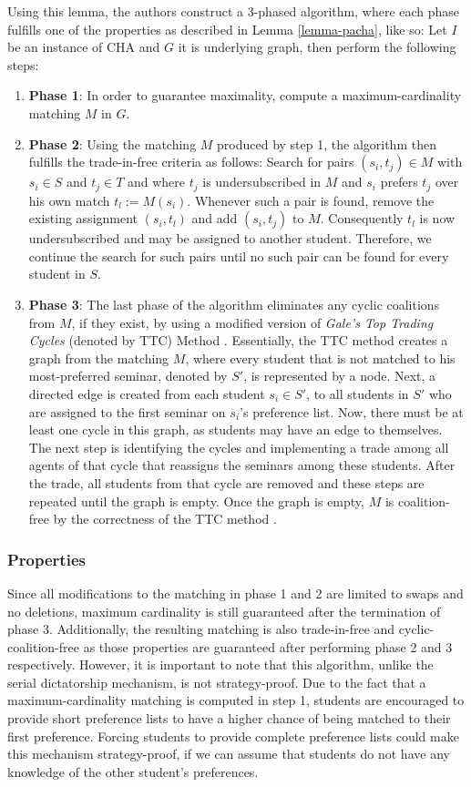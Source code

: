 Using this lemma, the authors \cite{SngThesis, Abraham:Pacha} construct a 3-phased algorithm, where each phase fulfills one of the properties as described in Lemma \ref{lemma-pacha}, like so: Let $I$ be an instance of CHA and $G$ it is underlying graph, then perform the following steps:
\begin{enumerate}
    \item \textbf{Phase 1}: In order to guarantee maximality, compute a maximum-cardinality matching $M$ in $G$.
    \item \textbf{Phase 2}: Using the matching $M$ produced by step 1, the algorithm then fulfills the trade-in-free criteria as follows: Search for pairs $(s_i, t_j) \in M$ with $s_i \in S$ and $t_j \in T$ and where $t_j$ is undersubscribed in $M$ and $s_i$ prefers $t_j$ over his own match $t_l := M(s_i)$. Whenever such a pair is found, remove the existing assignment $(s_i, t_l)$ and add $(s_i, t_j)$ to $M$. Consequently $t_l$ is now undersubscribed and may be assigned to another student. Therefore, we continue the search for such pairs until no such pair can be found for every student in $S$.
    \item \textbf{Phase 3}: The last phase of the algorithm eliminates any cyclic coalitions from $M$, if they exist, by using a modified version of \emph{Gale's Top Trading Cycles} (denoted by TTC) Method \cite{ShapleyTTC}. Essentially, the TTC method creates a graph from the matching $M$, where every student that is not matched to his most-preferred seminar, denoted by $S'$, is represented by a node. Next, a directed edge is created from each student $s_i \in S'$, to all students in $S'$ who are assigned to the first seminar on $s_i$'s preference list. Now, there must be at least one cycle in this graph, as students may have an edge to themselves. The next step is identifying the cycles and implementing a trade among all agents of that cycle that reassigns the seminars among these students. After the trade, all students from that cycle are removed and these steps are repeated until the graph is empty. Once the graph is empty, $M$ is coalition-free by the correctness of the TTC method \cite{Abraham:Pacha}.
\end{enumerate}

\subsubsection{Properties}
Since all modifications to the matching in phase 1 and 2 are limited to swaps and no deletions, maximum cardinality is still guaranteed after the termination of phase 3. Additionally, the resulting matching is also trade-in-free and cyclic-coalition-free as those properties are guaranteed after performing phase 2 and 3 respectively. However, it is important to note that this algorithm, unlike the serial dictatorship mechanism, is not strategy-proof. Due to the fact that a maximum-cardinality matching is computed in step 1, students are encouraged to provide short preference lists to have a higher chance of being matched to their first preference. Forcing students to provide complete preference lists could make this mechanism strategy-proof, if we can assume that students do not have any knowledge of the other student's preferences.

